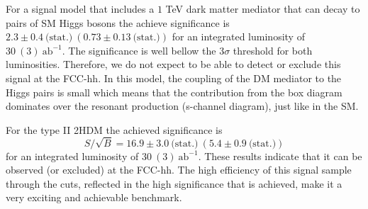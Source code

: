 For a signal model that includes a $1$ TeV dark matter mediator that can decay to pairs of SM Higgs bosons the achieve significance is $2.3\pm0.4~\text{(stat.)}~(0.73\pm0.13~\text{(stat.)})$ for an integrated luminosity of $30~(3)~\text{ab}^{-1}$. The significance is well bellow the $3\sigma$ threshold for both luminosities. Therefore, we do not expect to be able to detect or exclude this signal at the FCC-hh. In this model, the coupling of the DM mediator to the Higgs pairs is small which means that the contribution from the box diagram dominates over the resonant production (s-channel diagram), just like in the SM. 

For the type II 2HDM the achieved significance is
\begin{equation}
	S/\sqrt{B}=16.9\pm 3.0~\text{(stat.)}~(5.4\pm 0.9~\text{(stat.)})
\end{equation}
for an integrated luminosity of $30~(3)~\text{ab}^{-1}$. These results indicate that it can be observed (or excluded) at the FCC-hh. The high efficiency of this signal sample through the cuts, reflected in the high significance that is achieved, make it a very exciting and achievable benchmark. 

